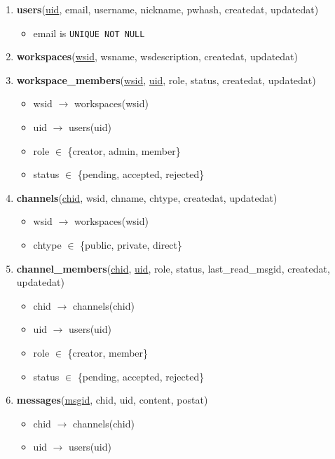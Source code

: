 \documentclass[11pt]{article}
\begin{document}
\begin{enumerate}
\item \textbf{users}(\underline{uid}, email, username, nickname, pwhash, createdat, updatedat)
\begin{itemize}
\item email is \texttt{UNIQUE NOT NULL}
\end{itemize}

\item \textbf{workspaces}(\underline{wsid}, wsname, wsdescription, createdat, updatedat)

\item \textbf{workspace\_members}(\underline{wsid}, \underline{uid}, role, status, createdat, updatedat)
    \begin{itemize}
        \item wsid $\rightarrow$ workspaces(wsid)
        \item uid $\rightarrow$ users(uid)
        \item role $\in$ \{creator, admin, member\}
        \item status $\in$ \{pending, accepted, rejected\}
    \end{itemize}

\item \textbf{channels}(\underline{chid}, wsid, chname, chtype, createdat, updatedat)
    \begin{itemize}
        \item wsid $\rightarrow$ workspaces(wsid)
        \item chtype $\in$ \{public, private, direct\}
    \end{itemize}

\item \textbf{channel\_members}(\underline{chid}, \underline{uid}, role, status, last\_read\_msgid, createdat, updatedat)
    \begin{itemize}
        \item chid $\rightarrow$ channels(chid)
        \item uid $\rightarrow$ users(uid)
        \item role $\in$ \{creator, member\}
        \item status $\in$ \{pending, accepted, rejected\}
    \end{itemize}

\item \textbf{messages}(\underline{msgid}, chid, uid, content, postat)
    \begin{itemize}
        \item chid $\rightarrow$ channels(chid)
        \item uid $\rightarrow$ users(uid)
    \end{itemize}

\end{enumerate}
\end{document}
